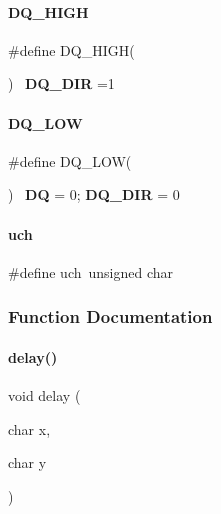 \paragraph{D\+Q\+\_\+\+H\+I\+GH}
{\footnotesize\ttfamily \#define D\+Q\+\_\+\+H\+I\+GH(\begin{DoxyParamCaption}{ }\end{DoxyParamCaption})~\textbf{ D\+Q\+\_\+\+D\+IR} =1}

\mbox{\label{a00050_a30fe2da9ee37703517bb92a6d894c619}} 
\paragraph{D\+Q\+\_\+\+L\+OW}
{\footnotesize\ttfamily \#define D\+Q\+\_\+\+L\+OW(\begin{DoxyParamCaption}{ }\end{DoxyParamCaption})~\textbf{ DQ} = 0; \textbf{ D\+Q\+\_\+\+D\+IR} = 0}

\mbox{\label{a00050_ae56eafdffb57fee0f07b2a33524eab4a}} 
\paragraph{uch}
{\footnotesize\ttfamily \#define uch~unsigned char}



\subsubsection{Function Documentation}
\mbox{\label{a00050_a0bdd09d004d02b67ac952b8da05e8115}} 
\paragraph{delay()}
{\footnotesize\ttfamily void delay (\begin{DoxyParamCaption}\item[{char}]{x,  }\item[{char}]{y }\end{DoxyParamCaption})}

